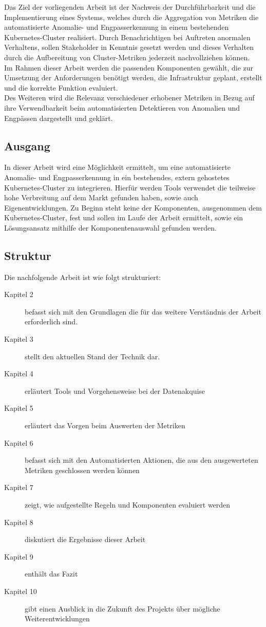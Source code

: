 \documentclass[a4paper,12pt]{scrartcl}
\begin{document}
Das Ziel der vorliegenden Arbeit ist der Nachweis der Durchführbarkeit und die Implementierung eines Systems, welches durch die Aggregation von Metriken die automatisierte Anomalie- und Engpasserkennung in einem bestehenden Kubernetes-Cluster realisiert. Durch Benachrichtigen bei Auftreten anormalen Verhaltens, sollen Stakeholder in Kenntnis gesetzt werden und dieses Verhalten durch die Aufbereitung von Cluster-Metriken jederzeit nachvollziehen können.\\
Im Rahmen dieser Arbeit werden die passenden Komponenten gewählt, die zur Umsetzung der Anforderungen benötigt werden, die Infrastruktur geplant, erstellt und die korrekte Funktion evaluiert.\\
Des Weiteren wird die Relevanz verschiedener erhobener Metriken in Bezug auf ihre Verwendbarkeit beim automatisierten Detektieren von Anomalien und Engpässen dargestellt und geklärt.

\subsection{Ausgang}

In dieser Arbeit wird eine Möglichkeit ermittelt, um eine automatisierte Anomalie- und Engpasserkennung in ein bestehendes, extern gehostetes Kubernetes-Cluster zu integrieren. Hierfür werden Tools verwendet die teilweise hohe Verbreitung auf dem Markt gefunden haben, sowie auch Eigenentwicklungen. Zu Beginn steht keine der Komponenten, ausgenommen dem Kubernetes-Cluster, fest und sollen im Laufe der Arbeit ermittelt, sowie ein Lösungsansatz mithilfe der Komponentenauswahl gefunden werden.

\subsection{Struktur}

Die nachfolgende Arbeit ist wie folgt strukturiert:\\

\begin{description}

\item [Kapitel 2] befasst sich mit den Grundlagen die für das weitere Verständnis der Arbeit erforderlich sind.
\item [Kapitel 3] stellt den aktuellen Stand der Technik dar.
\item [Kapitel 4] erläutert Tools und Vorgehensweise bei der Datenakquise
\item [Kapitel 5] erläutert das Vorgen beim Auswerten der Metriken
\item [Kapitel 6] befasst sich mit den Automatisierten Aktionen, die aus den ausgewerteten Metriken geschlossen werden können
\item [Kapitel 7] zeigt, wie aufgestellte Regeln und Komponenten evaluiert werden
\item [Kapitel 8] diskutiert die Ergebnisse dieser Arbeit
\item [Kapitel 9] enthält das Fazit
\item [Kapitel 10] gibt einen Ausblick in die Zukunft des Projekts über mögliche Weiterentwicklungen
\end{description}
\end{document}
